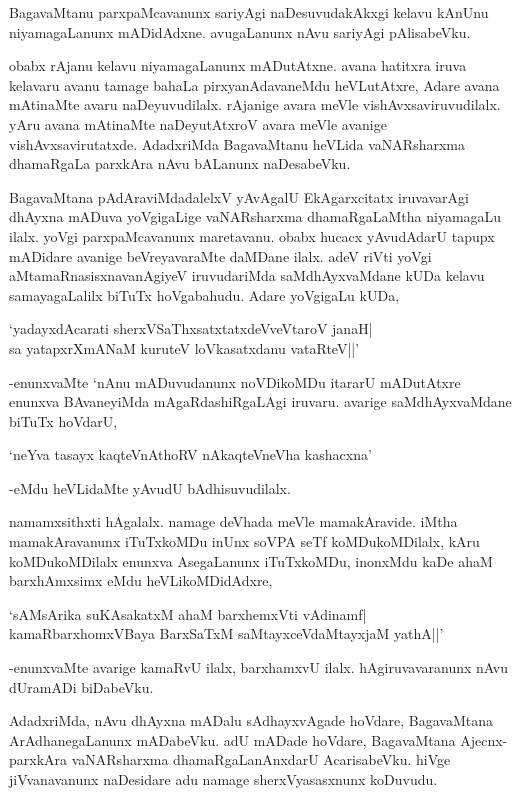 BagavaMtanu parxpaMcavanunx sariyAgi naDesuvudakAkxgi kelavu kAnUnu niyamagaLanunx mADidAdxne. avugaLanunx nAvu sariyAgi pAlisabeVku.

obabx rAjanu kelavu niyamagaLanunx mADutAtxne. avana hatitxra iruva kelavaru avanu tamage bahaLa pirxyanAdavaneMdu heVLutAtxre, Adare avana mAtinaMte avaru naDeyuvudilalx. rAjanige avara meVle vishAvxsaviruvudilalx. yAru avana mAtinaMte naDeyutAtxroV avara meVle avanige vishAvxsavirutatxde. AdadxriMda BagavaMtanu heVLida vaNARsharxma dhamaRgaLa parxkAra nAvu bALanunx naDesabeVku.

BagavaMtana pAdAraviMdadalelxV yAvAgalU EkAgarxcitatx iruvavarAgi dhAyxna mADuva yoVgigaLige vaNARsharxma dhamaRgaLaMtha niyamagaLu ilalx. yoVgi parxpaMcavanunx maretavanu. obabx hucacx yAvudAdarU tapupx mADidare avanige beVreyavaraMte daMDane ilalx. adeV riVti yoVgi aMtamaRnasisxnavanAgiyeV iruvudariMda saMdhAyxvaMdane kUDa kelavu samayagaLalilx biTuTx hoVgabahudu. Adare yoVgigaLu kUDa,

\begin{shloka}
`yadayxdAcarati sherxVSaThxsatxtatxdeVveVtaroV janaH|\\
sa yatapxrXmANaM kuruteV loVkasatxdanu vataRteV||'
\end{shloka}

-enunxvaMte `nAnu mADuvudanunx noVDikoMDu itararU mADutAtxre enunxva BAvaneyiMda mAgaRdashiRgaLAgi iruvaru. avarige saMdhAyxvaMdane biTuTx hoVdarU,

\begin{shloka}
`neYva tasayx kaqteVnAthoRV nAkaqteVneVha kashacxna'
\end{shloka}

-eMdu heVLidaMte yAvudU bAdhisuvudilalx.

namamxsithxti hAgalalx. namage deVhada meVle mamakAravide. iMtha mamakAravanunx iTuTxkoMDu inUnx soVPA seTf koMDukoMDilalx, kAru koMDukoMDilalx enunxva AsegaLanunx iTuTxkoMDu, inonxMdu kaDe ahaM barxhAmxsimx eMdu heVLikoMDidAdxre, 

\begin{shloka}
`sAMsArika suKAsakatxM ahaM barxhemxVti vAdinamf|\\
kamaRbarxhomxV\s Baya BarxSaTxM saMtayxceVdaMtayxjaM yathA||'
\end{shloka}

-enunxvaMte avarige kamaRvU ilalx, barxhamxvU ilalx. hAgiruvavaranunx nAvu dUramADi biDabeVku.

AdadxriMda, nAvu dhAyxna mADalu sAdhayxvAgade hoVdare, BagavaMtana ArAdhanegaLanunx mADabeVku. adU mADade hoVdare, BagavaMtana Ajecnx-parxkAra vaNARsharxma dhamaRgaLanAnxdarU AcarisabeVku. hiVge jiVvanavanunx naDesidare adu namage sherxVyasasxnunx koDuvudu.


\endchapter

